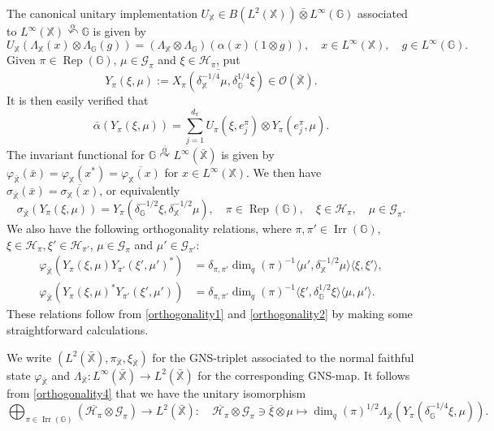 \documentclass[reqno]{amsart}
\numberwithin{equation}{section}
\DeclareMathOperator{\Rep}{\mathrm{Rep}}
\DeclareMathOperator{\Irr}{\mathrm{Irr}}
\newcommand{\mcG}{\mathcal{G}}
\newcommand{\mcH}{\mathcal{H}}
\newcommand{\mcO}{\mathcal{O}}
\newcommand{\G}{\mathbb{G}}
\newcommand{\X}{\mathbb{X}}
\newcommand{\ovot}{\bar{\otimes}}
\begin{document}
The canonical unitary implementation $U_\X\in B(L^2(\X))\ovot L^\infty(\G)$ associated to $L^\infty(\X)\stackrel{\alpha}\curvearrowleft \G$ is given by
\begin{equation}\label{formulaimplementation}
    U_\X(\Lambda_\X(x)\otimes \Lambda_\G(g)) = (\Lambda_\X\otimes \Lambda_\G)(\alpha(x)(1\otimes g)), \quad x\in L^\infty(\X), \quad g\in L^\infty(\G).
\end{equation}
Given $\pi \in \Rep(\G)$, $\mu\in \mcG_\pi$ and $\xi \in \mcH_\pi$, put
$$Y_\pi(\xi, \mu):= \overline{X_\pi(\delta_\X^{-1/4}\mu, \delta_\G^{1/4}\xi)}\in \mcO(\bar{\X}).$$
It is then easily verified that
\begin{equation}\label{baractionmatrixcoeff}\bar{\alpha}(Y_\pi(\xi, \mu))= \sum_{j=1}^{d_\pi} U_\pi(\xi, e_j^\pi)\otimes Y_\pi(e_j^\pi, \mu).\end{equation} The invariant functional for $\G\stackrel{\bar{\alpha}}\curvearrowright L^\infty(\bar{\X})$ is given by $\varphi_{\bar{\X}}(\bar{x})= \varphi_\X(x^*)= \overline{\varphi_\X(x)}$ for $x\in L^\infty(\X)$. We then have 
$\sigma_{\bar{\X}}(\bar{x})= \overline{\sigma_\X(x)}$, or equivalently 
$$\sigma_{\bar{\X}}(Y_\pi(\xi, \mu))  = Y_\pi(\delta_\G^{-1/2}\xi, \delta_\X^{-1/2}\mu), \quad \pi \in \Rep(\G), \quad \xi\in \mcH_\pi, \quad \mu \in \mcG_\pi.$$
We also have the following orthogonality relations, where $\pi, \pi'\in \Irr(\G)$, $\xi \in \mcH_\pi, \xi' \in \mcH_{\pi'}$, $\mu\in \mcG_\pi$ and $\mu'\in \mcG_{\pi'}$:
\begin{align}
    \label{orthogonality3}\varphi_{\bar{\X}}(Y_\pi(\xi, \mu) Y_{\pi'}(\xi',\mu')^*) &= \delta_{\pi, \pi'} \dim_q(\pi)^{-1}\langle \mu', \delta_\X^{-1/2}\mu\rangle \langle \xi, \xi'\rangle,\\
    \label{orthogonality4}\varphi_{\bar{\X}}(Y_\pi(\xi, \mu)^*Y_{\pi'}(\xi', \mu'))&= \delta_{\pi, \pi'}\dim_q(\pi)^{-1}\langle \xi', \delta_\G^{1/2}\xi\rangle\langle\mu, \mu'\rangle.
\end{align}
These relations follow from \eqref{orthogonality1} and \eqref{orthogonality2} by making some straightforward calculations.

We write $(L^2(\bar{\X}), \pi_{\bar{\X}}, \xi_{\bar{\X}})$ for the GNS-triplet associated to the normal faithful state $\varphi_{\bar{\X}}$ and $\Lambda_{\bar{\X}}: L^\infty(\bar{\X})\to L^2(\bar{\X})$ for the corresponding GNS-map. It follows from \eqref{orthogonality4} that we have the unitary isomorphism
\begin{equation}\label{unitaryiso2}
    \bigoplus_{\pi \in \Irr(\G)} (\overline{\mcH_\pi}\otimes \mcG_\pi) \to L^2(\bar{\X}):\quad \overline{\mcH_\pi}\otimes \mcG_\pi\ni \overline{\xi} \otimes \mu \mapsto \dim_q(\pi)^{1/2}\Lambda_{\bar{\X}}(Y_\pi(\delta_\G^{-1/4}\xi, \mu)).
\end{equation}
\end{document}
